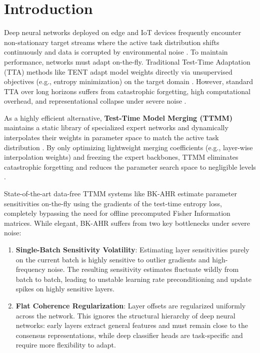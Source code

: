 \documentclass{article}
\theoremstyle{plain}
\theoremstyle{definition}
\theoremstyle{remark}
\begin{document}
\section{Introduction}
\label{sec:intro}
Deep neural networks deployed on edge and IoT devices frequently encounter non-stationary target streams where the active task distribution shifts continuously and data is corrupted by environmental noise \cite{wang2021tent, Niu2023TowardsST, Karmanov2024EfficientTA}. To maintain performance, networks must adapt on-the-fly. Traditional Test-Time Adaptation (TTA) methods like TENT \cite{Wang2021TentFT} adapt model weights directly via unsupervised objectives (e.g., entropy minimization) on the target domain \cite{Yuan2023RobustTA, Chen2022ContrastiveTA}. However, standard TTA over long horizons suffers from catastrophic forgetting, high computational overhead, and representational collapse under severe noise \cite{Lee2024EntropyIN, Kim2025BattlingTN}.

As a highly efficient alternative, \textbf{Test-Time Model Merging (TTMM)} \cite{yang2024testtime} maintains a static library of specialized expert networks and dynamically interpolates their weights in parameter space to match the active task distribution \cite{Wei2025ModelingMM, Li2025ModelMI, Corbeil2025AMA}. By only optimizing lightweight merging coefficients (e.g., layer-wise interpolation weights) and freezing the expert backbones, TTMM eliminates catastrophic forgetting and reduces the parameter search space to negligible levels \cite{Zhou2025BayesianTA, Guo2025SmoothingTS}. 

State-of-the-art data-free TTMM systems like BK-AHR estimate parameter sensitivities on-the-fly using the gradients of the test-time entropy loss, completely bypassing the need for offline precomputed Fisher Information matrices. While elegant, BK-AHR suffers from two key bottlenecks under severe noise:
\begin{enumerate}
    \item \textbf{Single-Batch Sensitivity Volatility}: Estimating layer sensitivities purely on the current batch is highly sensitive to outlier gradients and high-frequency noise. The resulting sensitivity estimates fluctuate wildly from batch to batch, leading to unstable learning rate preconditioning and update spikes on highly sensitive layers.
    \item \textbf{Flat Coherence Regularization}: Layer offsets are regularized uniformly across the network. This ignores the structural hierarchy of deep neural networks: early layers extract general features and must remain close to the consensus representations, while deep classifier heads are task-specific and require more flexibility to adapt.
\end{enumerate}
\end{document}
